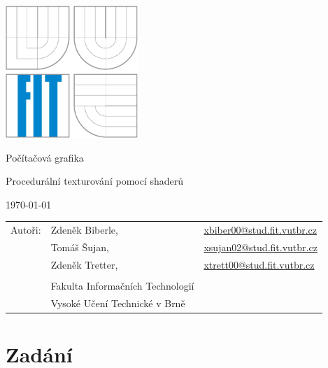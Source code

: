 \documentclass[12pt,a4paper,titlepage,final]{report}
\makeatletter
\newcommand\Course{Počítačová grafika}
\newcommand\WorkTitle{Procedurální texturování pomocí shaderů}
\newcommand\AuthorA{Zdeněk Biberle}
\newcommand\AuthorAEmail{xbiber00@stud.fit.vutbr.cz}
\newcommand\AuthorB{Tomáš Šujan}
\newcommand\AuthorBEmail{xsujan02@stud.fit.vutbr.cz}
\newcommand\AuthorC{Zdeněk Tretter}
\newcommand\AuthorCEmail{xtrett00@stud.fit.vutbr.cz}
\newcommand\Faculty{Fakulta Informačních Technologií}
\newcommand\School{Vysoké Učení Technické v Brně}
\makeatother
\begin{document}
	\begin{titlepage}
	\begin{center}
		\includegraphics[height=5cm]{images/logo.eps}
	\end{center}
	\vfill
	\begin{center}
		\begin{Large}
			\Course\\
		\end{Large}
		\bigskip
		\begin{Huge}
			\WorkTitle\\
		\end{Huge}
	\end{center}
	\vfill
	\begin{center}
		\begin{large}
			\today
		\end{large}
	\end{center}
	\vfill
	\begin{flushleft}
		\begin{large}
			\begin{tabular}{lll}
				Autoři: & \AuthorA, & \url{\AuthorAEmail} \\
				        & \AuthorB, & \url{\AuthorBEmail} \\
				        & \AuthorC, & \url{\AuthorCEmail} \\
				& & \\
				& \Faculty \\
				& \School \\
			\end{tabular}
		\end{large}
	\end{flushleft}
\end{titlepage}		
	
	
\tableofcontents

\newpage
\chapter{Zadání}
\end{document}
